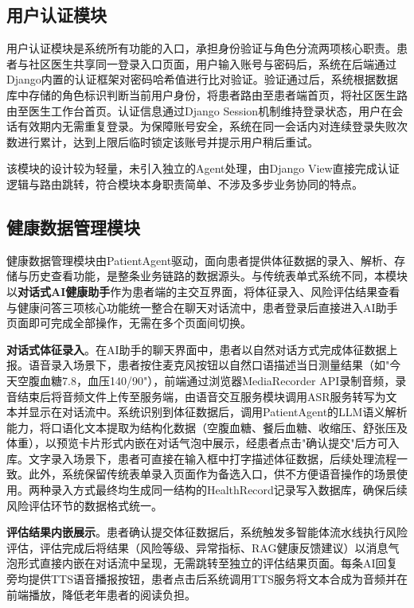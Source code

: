 \subsection{用户认证模块}

用户认证模块是系统所有功能的入口，承担身份验证与角色分流两项核心职责。患者与社区医生共享同一登录入口页面，用户输入账号与密码后，系统在后端通过Django内置的认证框架对密码哈希值进行比对验证。验证通过后，系统根据数据库中存储的角色标识判断当前用户身份，将患者路由至患者端首页，将社区医生路由至医生工作台首页。认证信息通过Django Session机制维持登录状态，用户在会话有效期内无需重复登录。为保障账号安全，系统在同一会话内对连续登录失败次数进行累计，达到上限后临时锁定该账号并提示用户稍后重试。

该模块的设计较为轻量，未引入独立的Agent处理，由Django View直接完成认证逻辑与路由跳转，符合模块本身职责简单、不涉及多步业务协同的特点。


\subsection{健康数据管理模块}

健康数据管理模块由PatientAgent驱动，面向患者提供体征数据的录入、解析、存储与历史查看功能，是整条业务链路的数据源头。与传统表单式系统不同，本模块以\textbf{对话式AI健康助手}作为患者端的主交互界面，将体征录入、风险评估结果查看与健康问答三项核心功能统一整合在聊天对话流中，患者登录后直接进入AI助手页面即可完成全部操作，无需在多个页面间切换。

\textbf{对话式体征录入}。在AI助手的聊天界面中，患者以自然对话方式完成体征数据上报。语音录入场景下，患者按住麦克风按钮以自然口语描述当日测量结果（如"今天空腹血糖7.8，血压140/90"），前端通过浏览器MediaRecorder API录制音频，录音结束后将音频文件上传至服务端，由语音交互服务模块调用ASR服务转写为文本并显示在对话流中。系统识别到体征数据后，调用PatientAgent的LLM语义解析能力，将口语化文本提取为结构化数据（空腹血糖、餐后血糖、收缩压、舒张压及体重），以预览卡片形式内嵌在对话气泡中展示，经患者点击"确认提交"后方可入库。文字录入场景下，患者可直接在输入框中打字描述体征数据，后续处理流程一致。此外，系统保留传统表单录入页面作为备选入口，供不方便语音操作的场景使用。两种录入方式最终均生成同一结构的HealthRecord记录写入数据库，确保后续风险评估环节的数据格式统一。

\textbf{评估结果内嵌展示}。患者确认提交体征数据后，系统触发多智能体流水线执行风险评估，评估完成后将结果（风险等级、异常指标、RAG健康反馈建议）以消息气泡形式直接内嵌在对话流中呈现，无需跳转至独立的评估结果页面。每条AI回复旁均提供TTS语音播报按钮，患者点击后系统调用TTS服务将文本合成为音频并在前端播放，降低老年患者的阅读负担。

